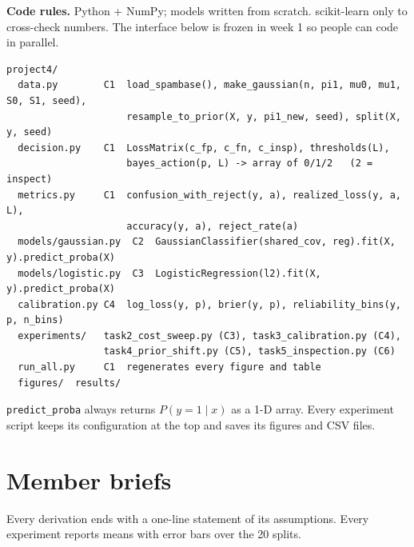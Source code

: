 \documentclass[11pt,a4paper]{article}
\begin{document}
\textbf{Code rules.} Python + NumPy; models written from scratch. scikit-learn only to cross-check numbers.
The interface below is frozen in week 1 so people can code in parallel.

{\small
\begin{verbatim}
project4/
  data.py        C1  load_spambase(), make_gaussian(n, pi1, mu0, mu1, S0, S1, seed),
                     resample_to_prior(X, y, pi1_new, seed), split(X, y, seed)
  decision.py    C1  LossMatrix(c_fp, c_fn, c_insp), thresholds(L),
                     bayes_action(p, L) -> array of 0/1/2   (2 = inspect)
  metrics.py     C1  confusion_with_reject(y, a), realized_loss(y, a, L),
                     accuracy(y, a), reject_rate(a)
  models/gaussian.py  C2  GaussianClassifier(shared_cov, reg).fit(X, y).predict_proba(X)
  models/logistic.py  C3  LogisticRegression(l2).fit(X, y).predict_proba(X)
  calibration.py C4  log_loss(y, p), brier(y, p), reliability_bins(y, p, n_bins)
  experiments/   task2_cost_sweep.py (C3), task3_calibration.py (C4),
                 task4_prior_shift.py (C5), task5_inspection.py (C6)
  run_all.py     C1  regenerates every figure and table
  figures/  results/
\end{verbatim}
}
\texttt{predict\_proba} always returns $P(y=1\mid x)$ as a 1-D array. Every experiment script keeps its
configuration at the top and saves its figures and CSV files.

\section{Member briefs}

Every derivation ends with a one-line statement of its assumptions. Every experiment reports means with error bars
over the 20 splits.
\end{document}
